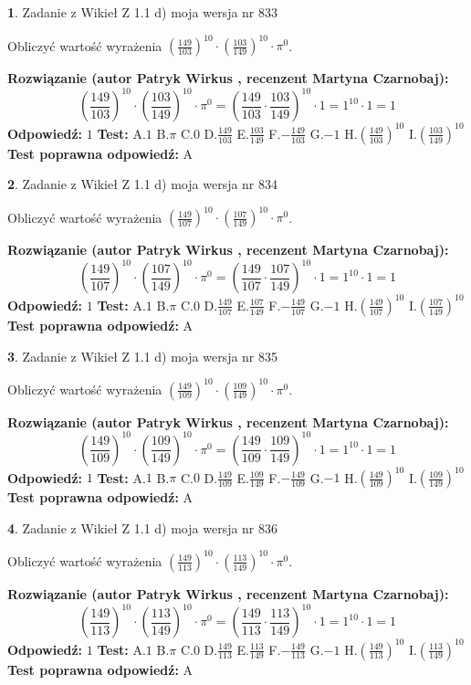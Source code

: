 \documentclass[12pt, a4paper]{article}
\theoremstyle{definition} %
\newtheorem{zad}{}
\newcommand{\zadStart}[1]{\begin{zad}#1\newline}
\newcommand{\zadStop}{\end{zad}}
\newcommand{\rozwStart}[2]{\noindent \textbf{Rozwiązanie (autor #1 , recenzent #2): }\newline}
\newcommand{\rozwStop}{\newline}
\newcommand{\odpStart}{\noindent \textbf{Odpowiedź:}\newline}
\newcommand{\odpStop}{\newline}
\newcommand{\testStart}{\noindent \textbf{Test:}\newline}
\newcommand{\testStop}{\newline}
\newcommand{\kluczStart}{\noindent \textbf{Test poprawna odpowiedź:}\newline}
\newcommand{\kluczStop}{\newline}
\begin{document}
\zadStart{Zadanie z Wikieł Z 1.1 d) moja wersja nr 833}

Obliczyć wartość wyrażenia $(\frac{149}{103})^{10} \cdot (\frac{103}{149})^{10} \cdot \pi^{0}$.
\zadStop
\rozwStart{Patryk Wirkus}{Martyna Czarnobaj}
$$(\frac{149}{103})^{10} \cdot (\frac{103}{149})^{10} \cdot \pi^{0} = (\frac{149}{103} \cdot \frac{103}{149})^{10} \cdot 1 = 1^{10} \cdot 1 = 1$$
\rozwStop
\odpStart
$1$
\odpStop
\testStart
A.$1$ B.$\pi$ C.$0$ D.$\frac{149}{103}$ E.$\frac{103}{149}$
F.$-\frac{149}{103}$ G.$-1$
H.$(\frac{149}{103})^{10}$
I.$(\frac{103}{149})^{10}$
\testStop
\kluczStart
A
\kluczStop



\zadStart{Zadanie z Wikieł Z 1.1 d) moja wersja nr 834}

Obliczyć wartość wyrażenia $(\frac{149}{107})^{10} \cdot (\frac{107}{149})^{10} \cdot \pi^{0}$.
\zadStop
\rozwStart{Patryk Wirkus}{Martyna Czarnobaj}
$$(\frac{149}{107})^{10} \cdot (\frac{107}{149})^{10} \cdot \pi^{0} = (\frac{149}{107} \cdot \frac{107}{149})^{10} \cdot 1 = 1^{10} \cdot 1 = 1$$
\rozwStop
\odpStart
$1$
\odpStop
\testStart
A.$1$ B.$\pi$ C.$0$ D.$\frac{149}{107}$ E.$\frac{107}{149}$
F.$-\frac{149}{107}$ G.$-1$
H.$(\frac{149}{107})^{10}$
I.$(\frac{107}{149})^{10}$
\testStop
\kluczStart
A
\kluczStop



\zadStart{Zadanie z Wikieł Z 1.1 d) moja wersja nr 835}

Obliczyć wartość wyrażenia $(\frac{149}{109})^{10} \cdot (\frac{109}{149})^{10} \cdot \pi^{0}$.
\zadStop
\rozwStart{Patryk Wirkus}{Martyna Czarnobaj}
$$(\frac{149}{109})^{10} \cdot (\frac{109}{149})^{10} \cdot \pi^{0} = (\frac{149}{109} \cdot \frac{109}{149})^{10} \cdot 1 = 1^{10} \cdot 1 = 1$$
\rozwStop
\odpStart
$1$
\odpStop
\testStart
A.$1$ B.$\pi$ C.$0$ D.$\frac{149}{109}$ E.$\frac{109}{149}$
F.$-\frac{149}{109}$ G.$-1$
H.$(\frac{149}{109})^{10}$
I.$(\frac{109}{149})^{10}$
\testStop
\kluczStart
A
\kluczStop



\zadStart{Zadanie z Wikieł Z 1.1 d) moja wersja nr 836}

Obliczyć wartość wyrażenia $(\frac{149}{113})^{10} \cdot (\frac{113}{149})^{10} \cdot \pi^{0}$.
\zadStop
\rozwStart{Patryk Wirkus}{Martyna Czarnobaj}
$$(\frac{149}{113})^{10} \cdot (\frac{113}{149})^{10} \cdot \pi^{0} = (\frac{149}{113} \cdot \frac{113}{149})^{10} \cdot 1 = 1^{10} \cdot 1 = 1$$
\rozwStop
\odpStart
$1$
\odpStop
\testStart
A.$1$ B.$\pi$ C.$0$ D.$\frac{149}{113}$ E.$\frac{113}{149}$
F.$-\frac{149}{113}$ G.$-1$
H.$(\frac{149}{113})^{10}$
I.$(\frac{113}{149})^{10}$
\testStop
\kluczStart
A
\kluczStop
\end{document}
